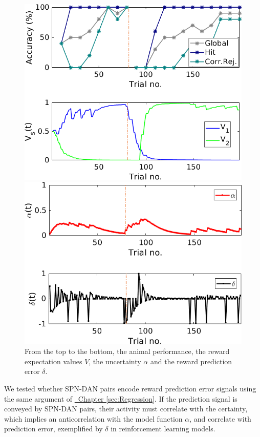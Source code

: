 \begin{figure}
    \centering
    \includegraphics[scale=0.7]{figures/PavPerfV2.png}
    
    \vspace{0.5cm}
    
    \includegraphics[scale=0.7]{figures/PavAlphaDelta1.png}
    \caption{From the top to the bottom, the animal performance, the reward expectation values $V$, the uncertainty $\alpha$ and the reward prediction error $\delta$.}
    \label{fig:PavRL_ex}
\end{figure}
We tested whether SPN-DAN pairs encode reward prediction error signals using the same argument of \hyperref[sec:Regression]{~Chapter \ref*{sec:Regression}}. If the prediction signal is conveyed by SPN-DAN pairs, their activity must correlate with the certainty, which implies an anticorrelation with the model function $\alpha$, and correlate with prediction error, exemplified by $\delta$ in reinforcement learning models.\\
